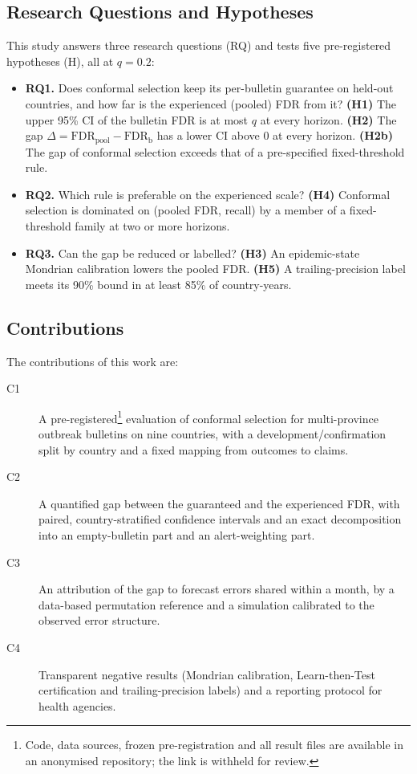 \documentclass[conference]{IEEEtran}
\newcommand{\FDRb}{\mathrm{FDR}_{\mathrm{b}}}
\newcommand{\FDRp}{\mathrm{FDR}_{\mathrm{pool}}}
\begin{document}
\subsection{Research Questions and Hypotheses}
This study answers three research questions (RQ) and tests five pre-registered hypotheses (H), all at $q=0.2$:
\begin{itemize}
\item \textbf{RQ1.} Does conformal selection keep its per-bulletin guarantee on held-out countries, and how far is the experienced (pooled) FDR from it? \textbf{(H1)} The upper 95\% CI of the bulletin FDR is at most $q$ at every horizon. \textbf{(H2)} The gap $\Delta=\FDRp-\FDRb$ has a lower CI above 0 at every horizon. \textbf{(H2b)} The gap of conformal selection exceeds that of a pre-specified fixed-threshold rule.
\item \textbf{RQ2.} Which rule is preferable on the experienced scale? \textbf{(H4)} Conformal selection is dominated on (pooled FDR, recall) by a member of a fixed-threshold family at two or more horizons.
\item \textbf{RQ3.} Can the gap be reduced or labelled? \textbf{(H3)} An epidemic-state Mondrian calibration lowers the pooled FDR. \textbf{(H5)} A trailing-precision label meets its 90\% bound in at least 85\% of country-years.
\end{itemize}

\subsection{Contributions}
The contributions of this work are:
\begin{description}
\item[C1] A pre-registered\footnote{Code, data sources, frozen pre-registration and all result files are available in an anonymised repository; the link is withheld for review.} evaluation of conformal selection for multi-province outbreak bulletins on nine countries, with a development/confirmation split by country and a fixed mapping from outcomes to claims.
\item[C2] A quantified gap between the guaranteed and the experienced FDR, with paired, country-stratified confidence intervals and an exact decomposition into an empty-bulletin part and an alert-weighting part.
\item[C3] An attribution of the gap to forecast errors shared within a month, by a data-based permutation reference and a simulation calibrated to the observed error structure.
\item[C4] Transparent negative results (Mondrian calibration, Learn-then-Test certification and trailing-precision labels) and a reporting protocol for health agencies.
\end{description}
\end{document}
